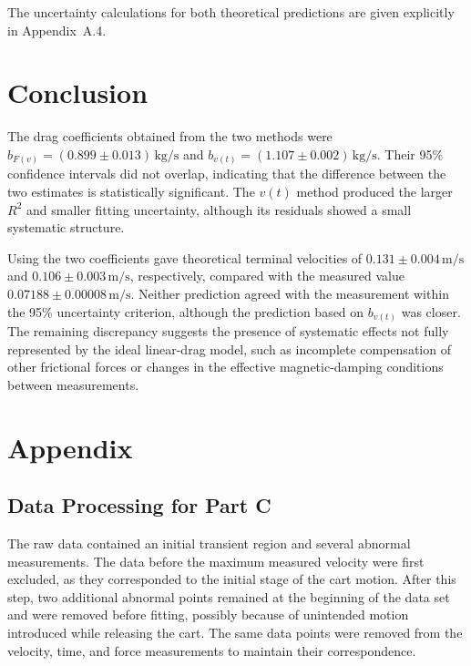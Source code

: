 \documentclass[11pt,a4paper]{article}
\begin{document}
The uncertainty calculations for both theoretical predictions are given explicitly in Appendix~A.4.


\section{Conclusion}

The drag coefficients obtained from the two methods were
\(b_{F(v)}=(0.899\pm0.013)\,\mathrm{kg/s}\) and
\(b_{v(t)}=(1.107\pm0.002)\,\mathrm{kg/s}\).
Their 95\% confidence intervals did not overlap, indicating that the difference between the two estimates is statistically significant. The \(v(t)\) method produced the larger \(R^2\) and smaller fitting uncertainty, although its residuals showed a small systematic structure.

Using the two coefficients gave theoretical terminal velocities of
\(0.131\pm0.004\,\mathrm{m/s}\) and
\(0.106\pm0.003\,\mathrm{m/s}\), respectively, compared with the measured value
\(0.07188\pm0.00008\,\mathrm{m/s}\).
Neither prediction agreed with the measurement within the 95\% uncertainty criterion, although the prediction based on \(b_{v(t)}\) was closer. The remaining discrepancy suggests the presence of systematic effects not fully represented by the ideal linear-drag model, such as incomplete compensation of other frictional forces or changes in the effective magnetic-damping conditions between measurements.


\appendix
\section{Appendix}


\subsection{Data Processing for Part C}
\label{app:data}

The raw data contained an initial transient region and several abnormal measurements. The data before the maximum measured velocity were first excluded, as they corresponded to the initial stage of the cart motion. After this step, two additional abnormal points remained at the beginning of the data set and were removed before fitting, possibly because of unintended motion introduced while releasing the cart. The same data points were removed from the velocity, time, and force measurements to maintain their correspondence.
\end{document}

